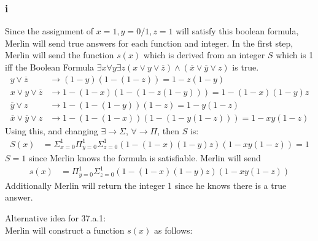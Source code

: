\documentclass[letterpaper,notitlepage,twoside]{article}
\begin{document}
\subsubsection*{i}
Since the assignment of $x=1,y=0/1,z=1$ will satisfy this boolean formula, Merlin will send true answers for each function and integer. In the first step, Merlin will send the function $s(x)$ which is derived from an integer $S$ which is 1 iff the Boolean Formula $\exists x \forall y \exists z ( x \lor y \lor \overline{z}) \land (\overline{x} \lor \overline{y} \lor z)$ is true.
\begin{align*}
y \lor \overline{z} &\rightarrow (1 - y)(1 - (1 - z)) = 1 - z(1 - y)\\
x \lor y \lor \overline{z} &\rightarrow 1 - (1 - x)(1 - (1 - z(1 - y))) = 1 - (1 - x)(1 - y)z\\
\overline{y} \lor z &\rightarrow 1 - (1 - (1 - y))(1 - z) = 1 - y(1 - z)\\
\overline{x} \lor \overline{y} \lor z &\rightarrow 1 - (1 - (1 - x))(1 - (1 - y(1 - z))) = 1 - xy(1 - z)
\end{align*}
Using this, and changing $\exists \rightarrow \Sigma$, $\forall \rightarrow \Pi$, then $S$ is:
\begin{align*}
S(x)&=\Sigma_{x = 0}^1\Pi_{y = 0}^1\Sigma_{z = 0}^1 (1 - (1 - x)(1 - y)z)(1 - xy(1 - z)) = 1
\end{align*}
$S=1$ since Merlin knows the formula is satisfiable. Merlin will send
\begin{align*}
s(x)&=\Pi_{y = 0}^1\Sigma_{z = 0}^1 (1 - (1 - x)(1 - y)z)(1 - xy(1 - z))
\end{align*}
Additionally Merlin will return the integer 1 since he knows there is a true answer.

Alternative idea for 37.a.1:\\
Merlin will construct a function $s(x)$ as follows:
\end{document}
